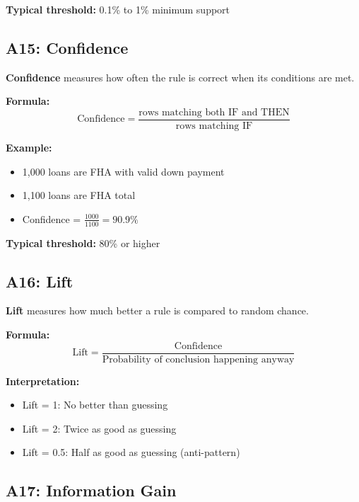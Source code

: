 \documentclass[11pt,a4paper]{article}
\begin{document}
\textbf{Typical threshold:} 0.1\% to 1\% minimum support

\subsection*{A15: Confidence}
\label{A15}

\textbf{Confidence} measures how often the rule is correct when its conditions are met.

\textbf{Formula:}
\[
\text{Confidence} = \frac{\text{rows matching both IF and THEN}}{\text{rows matching IF}}
\]

\textbf{Example:}
\begin{itemize}
    \item 1,000 loans are FHA with valid down payment
    \item 1,100 loans are FHA total
    \item Confidence = $\frac{1000}{1100} = 90.9\%$
\end{itemize}

\textbf{Typical threshold:} 80\% or higher

\subsection*{A16: Lift}
\label{A16}

\textbf{Lift} measures how much better a rule is compared to random chance.

\textbf{Formula:}
\[
\text{Lift} = \frac{\text{Confidence}}{\text{Probability of conclusion happening anyway}}
\]

\textbf{Interpretation:}
\begin{itemize}
    \item Lift = 1: No better than guessing
    \item Lift = 2: Twice as good as guessing
    \item Lift = 0.5: Half as good as guessing (anti-pattern)
\end{itemize}

\subsection*{A17: Information Gain}
\label{A17}
\end{document}
